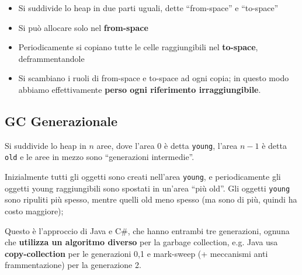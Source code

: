 \documentclass[a4paper,10pt]{article}
\begin{document}
\begin{itemize}
 \item Si suddivide lo heap in due parti uguali, dette ``from-space'' e ``to-space''
 \item Si può allocare solo nel \textbf{from-space}
 \item Periodicamente si copiano tutte le celle raggiungibili nel \textbf{to-space}, deframmentandole
 \item Si scambiano i ruoli di from-space e to-space ad ogni copia; in questo modo abbiamo effettivamente \textbf{perso ogni riferimento irraggiungibile}.
\end{itemize}

\subsection{GC Generazionale}
Si suddivide lo heap in $n$ aree, dove l'area $0$ è detta \texttt{young}, l'area $n-1$ è detta \texttt{old} e le aree in mezzo sono ``generazioni intermedie''.\smallskip

Inizialmente tutti gli oggetti sono creati nell'area \texttt{young}, e periodicamente gli oggetti young raggiungibili sono spostati in un'area ``più old''. Gli oggetti \texttt{young} sono ripuliti più spesso, mentre quelli old meno spesso (ma sono di più, quindi ha costo maggiore);\smallskip

Questo è l'approccio di Java e C\#, che hanno entrambi tre generazioni, ognuna che \textbf{utilizza un algoritmo diverso} per la garbage collection, e.g. Java usa \textbf{copy-collection} per le generazioni 0,1 e mark-sweep (+ meccanismi anti frammentazione) per la generazione 2.
\end{document}
